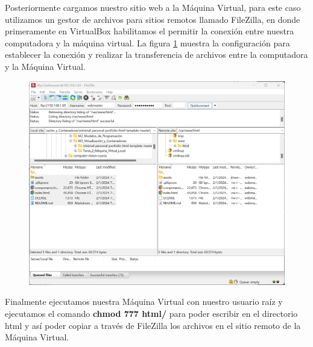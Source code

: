 \documentclass[12pt,a4paper]{article}
\begin{document}
Posteriormente cargamos nuestro sitio web a la Máquina Virtual, para este caso utilizamos un gestor de archivos para sitios remotos llamado FileZilla, en donde primeramente en VirtualBox habilitamos el permitir la conexión entre nuestra computadora y la máquina virtual. La figura \ref{fig:Cargado_sitio_web_1} muestra la configuración para establecer la conexión y realizar la transferencia de archivos entre la computadora y la Máquina Virtual.

\begin{figure}[H]
    \centering
    \includegraphics[width=1\linewidth]{M3_Virtualización_y_Contenedores/Tarea_2_Máquina_Virtual_Local/reporte/figuras/6-1_Carga_Sitio_Web_en_MV.png}
    \label{fig:Cargado_sitio_web_1}
\end{figure}

Finalmente ejecutamos nuestra Máquina Virtual con nuestro usuario raíz y ejecutamos el comando \textbf{chmod 777 html/} para poder escribir en el directorio html y así poder copiar a través de FileZilla los archivos en el sitio remoto de la Máquina Virtual.
\end{document}
